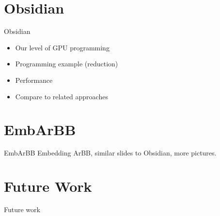 \documentclass[xcolor=dvipsnames]{beamer}
\begin{document}
\section{Obsidian}
\begin{frame}{Obsidian} 
  
  \begin{itemize} 
    \item Our level of GPU programming 
    \item Programming example  (reduction) 
    \item Performance 
    \item Compare to related approaches 
  \end{itemize}
      
\end{frame} 

%
\section{EmbArBB} 

\begin{frame}{EmbArBB} 
  Embedding ArBB, similar slides to Obsidian, more pictures. 

\end{frame} 



%
\section{Future Work}
\begin{frame}{Future work} 

\end{frame} 
\end{document}

